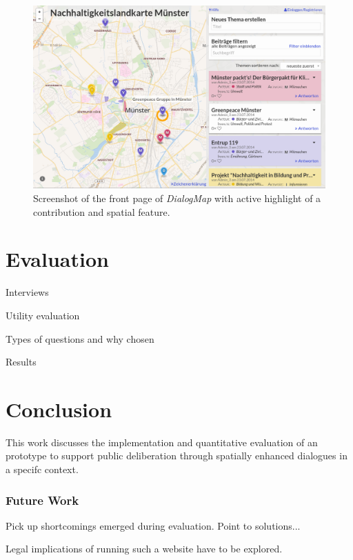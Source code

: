 \documentclass{sigchi}
\begin{document}
\begin{figure}[!h]
    \centering
    \includegraphics[width=0.9\columnwidth]{screenshot}
    \caption{Screenshot of the front page of \textit{DialogMap} with active highlight of a contribution and spatial feature.}
    \label{fig:screenshot}
\end{figure}


\section{Evaluation}


Interviews

Utility evaluation

Types of questions and why chosen

Results

\section{Conclusion}

This work discusses the implementation and quantitative evaluation of an prototype to support public deliberation through spatially enhanced dialogues in a specifc context.

\subsubsection{Future Work}
Pick up shortcomings emerged during evaluation. Point to solutions...

Legal implications of running such a website have to be explored.

\end{document}
